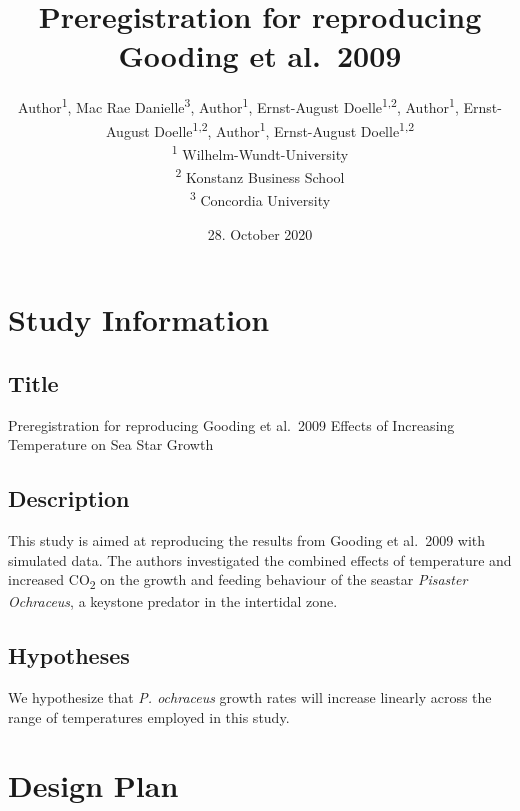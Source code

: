 \documentclass[]{article}
\title{Preregistration for reproducing Gooding et al.~2009}
\author{
          Author\textsuperscript{1},
          Mac Rae Danielle\textsuperscript{3},
          Author\textsuperscript{1},
          Ernst-August Doelle\textsuperscript{1,2},
          Author\textsuperscript{1},
          Ernst-August Doelle\textsuperscript{1,2},
          Author\textsuperscript{1},
          Ernst-August Doelle\textsuperscript{1,2}          \\ \vspace{0.5cm}
              \textsuperscript{1} Wilhelm-Wundt-University\\
              \textsuperscript{2} Konstanz Business School\\
              \textsuperscript{3} Concordia University      }
\date{28. October 2020}
\newcounter{question}
\begin{document}
\maketitle
\vspace{2pc}


\newcommand\Question[2]{%
   \leavevmode\par
   \stepcounter{question}
   \noindent
   \textbf{\thequestion. #1}. #2\par}

\newcommand\Answer[1]{%
    \noindent
    \textit{Registered response}: #1\par}
    
\hypertarget{study-information}{%
\section{Study Information}\label{study-information}}

\hypertarget{title}{%
\subsection{Title}\label{title}}

Preregistration for reproducing Gooding et al.~2009 Effects of
Increasing Temperature on Sea Star Growth

\hypertarget{description}{%
\subsection{Description}\label{description}}

This study is aimed at reproducing the results from Gooding et al.~2009
with simulated data. The authors investigated the combined effects of
temperature and increased CO\textsubscript{2} on the growth and feeding
behaviour of the seastar \emph{Pisaster Ochraceus}, a keystone predator
in the intertidal zone.

\hypertarget{hypotheses}{%
\subsection{Hypotheses}\label{hypotheses}}

We hypothesize that \emph{P. ochraceus} growth rates will increase
linearly across the range of temperatures employed in this study.

\hypertarget{design-plan}{%
\section{Design Plan}\label{design-plan}}
\end{document}
